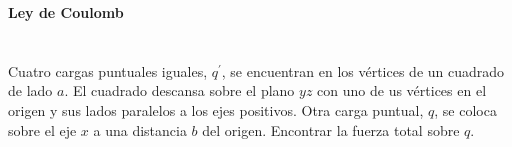 \documentclass[./../main.tex]{subfiles}
\begin{document}
    {\LARGE\textbf{Ley de Coulomb}\vspace*{-1.5em}}

    \section{}
    
    Cuatro cargas puntuales iguales, \(q^{\prime}\), se encuentran en los vértices de un cuadrado de lado \(a\). El cuadrado descansa sobre el plano \(yz\) con uno de us vértices en el origen y sus lados paralelos a los ejes positivos. Otra carga puntual, \(q\), se coloca sobre el eje \(x\) a una distancia \(b\) del origen. Encontrar la fuerza total sobre \(q\).
\end{document}
